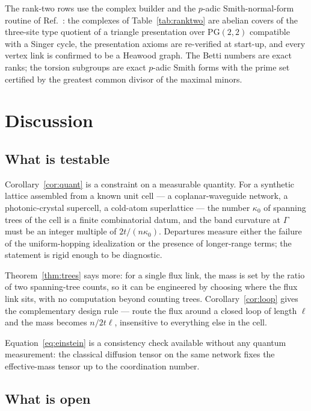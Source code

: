 \documentclass[aps,prb,reprint,amsmath,amssymb,floatfix,superscriptaddress]{revtex4-2}
\theoremstyle{plain}
\theoremstyle{definition}
\theoremstyle{remark}
\begin{document}
The rank-two rows use the complex builder and the $p$-adic Smith-normal-form routine of
Ref.~: the complexes of Table~\ref{tab:ranktwo} are abelian covers of
the three-site type quotient of a triangle presentation over $\mathrm{PG}(2,2)$ compatible
with a Singer cycle, the presentation axioms are re-verified at start-up, and every vertex
link is confirmed to be a Heawood graph. The Betti numbers are exact ranks; the torsion
subgroups are exact $p$-adic Smith forms with the prime set certified by the greatest common
divisor of the maximal minors.

\section{Discussion}\label{sec:disc}

\subsection{What is testable}

Corollary~\ref{cor:quant} is a constraint on a measurable quantity. For a synthetic lattice
assembled from a known unit cell --- a coplanar-waveguide network, a photonic-crystal
supercell, a cold-atom superlattice --- the number $\kappa_0$ of spanning trees of the cell
is a finite combinatorial datum, and the band curvature at $\Gamma$ must be an integer
multiple of $2t/(n\kappa_0)$. Departures measure either the failure of the uniform-hopping
idealization or the presence of longer-range terms; the statement is rigid enough to be
diagnostic.

Theorem~\ref{thm:trees} says more: for a single flux link, the mass is set by the ratio of
two spanning-tree counts, so it can be engineered by choosing where the flux link sits, with
no computation beyond counting trees. Corollary~\ref{cor:loop} gives the complementary
design rule --- route the flux around a closed loop of length $\ell$ and the mass becomes
$n/2t\ell$, insensitive to everything else in the cell.

Equation~\eqref{eq:einstein} is a consistency check available without any quantum
measurement: the classical diffusion tensor on the same network fixes the effective-mass
tensor up to the coordination number.

\subsection{What is open}
\end{document}
